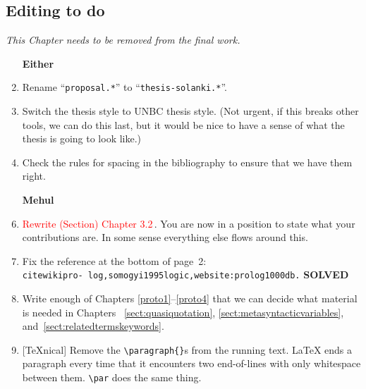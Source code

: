 
\begin{scope}
\nolinenumbers
\section{Editing to do}\label{sect:to-do}

\textit{\color{red} This Chapter needs to be removed from the final
  work.}

\begin{enumerate}
\item [\textbf{Either}]
\item Rename ``\Verb!proposal.*!'' to ``\Verb!thesis-solanki.*!''.
\item Switch the thesis style to UNBC thesis style.  (Not urgent, if
  this breaks other tools, we can do this last, but it would be nice to
  have a sense of what the thesis is going to look like.)
\item
  Check the rules for spacing in the bibliography to ensure that we have
  them right.
  
\item [\textbf{Mehul}]

\item
  \textcolor{red}{Rewrite (Section) Chapter 3.2}\,.
  You are now in a position to state what your contributions are.
  In some sense everything else flows around this.

\item
  Fix the reference at the bottom of page~2:\\
  \Verb!citewikipro- log,somogyi1995logic,website:prolog1000db.!  \textbf{SOLVED}
\item
  Write enough of Chapters \ref{proto1}--\ref{proto4} that we can decide
  what material is needed in Chapters~ \ref{sect:quasiquotation},
  \ref{sect:metasyntacticvariables},
  and~\ref{sect:relatedtermskeywords}.
\item
  {}[\TeX{}nical]
  Remove the \Verb!\paragraph{}!s from the running text.  \LaTeX{}
  ends a paragraph every time that it encounters two end-of-lines
  with only whitespace between them.  \Verb!\par! does the same thing.


\end{enumerate}
\end{scope}

